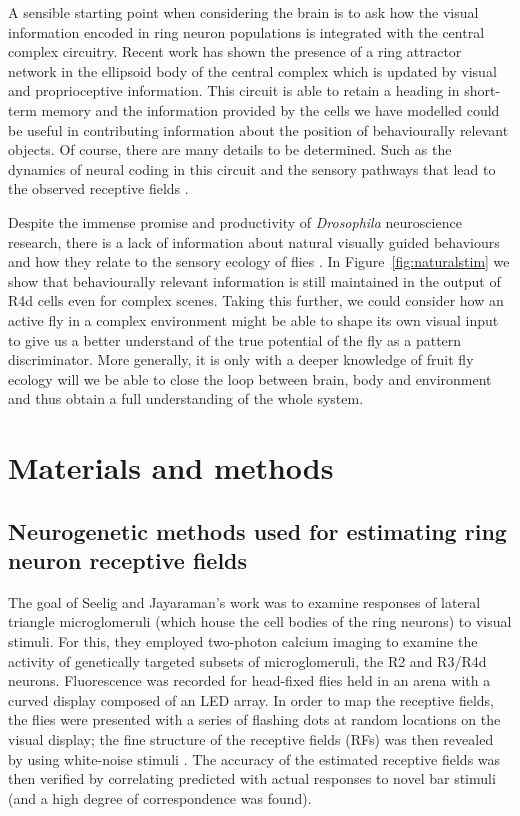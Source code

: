 A sensible starting point when considering the brain is to ask how the visual information encoded in ring neuron populations is integrated with the central complex circuitry.
Recent work has shown the presence of a ring attractor network \cite{Seelig2015,Cope2017,Green2017,Turner-Evans2017} in the ellipsoid body of the central complex which is updated by visual and proprioceptive information.
This circuit is able to retain a heading in short-term memory \cite{Neuser2008} and the information provided by the cells we have modelled could be useful in contributing information about the position of behaviourally relevant objects.
Of course, there are many details to be determined. Such as the dynamics of neural coding in this circuit and the sensory pathways that lead to the observed receptive fields \cite{Sun2017}.

Despite the immense promise and productivity of \emph{Drosophila} neuroscience research, there is a lack of information about natural visually guided behaviours and how they relate to the sensory ecology of flies \cite{Dickinson2014}.
In Figure~\ref{fig:naturalstim} we show that behaviourally relevant information is still maintained in the output of R4d cells even for complex scenes.
Taking this further, we could consider how an active fly in a complex environment might be able to shape its own visual input to give us a better understand of the true potential of the fly as a pattern discriminator.
More generally, it is only with a deeper knowledge of fruit fly ecology will we be able to close the loop between brain, body and environment and thus obtain a full understanding of the whole system.

\section*{Materials and methods}
\subsection*{Neurogenetic methods used for estimating ring neuron receptive fields}
\label{sec:methods:seelig}
The goal of Seelig and Jayaraman's work \cite{Seelig2013} was to examine responses of lateral triangle microglomeruli (which house the cell bodies of the ring neurons) to visual stimuli.
For this, they employed two-photon calcium imaging to examine the activity of genetically targeted subsets of microglomeruli, the R2 and R3/R4d neurons.
Fluorescence was recorded for head-fixed flies held in an arena with a curved display composed of an LED array.
In order to map the receptive fields, the flies were presented with a series of flashing dots at random locations on the visual display; the fine structure of the receptive fields (\acp{RF}) was then revealed by using white-noise stimuli \cite{Weber2010}.
The accuracy of the estimated receptive fields was then verified by correlating predicted with actual responses to novel bar stimuli (and a high degree of correspondence was found).

